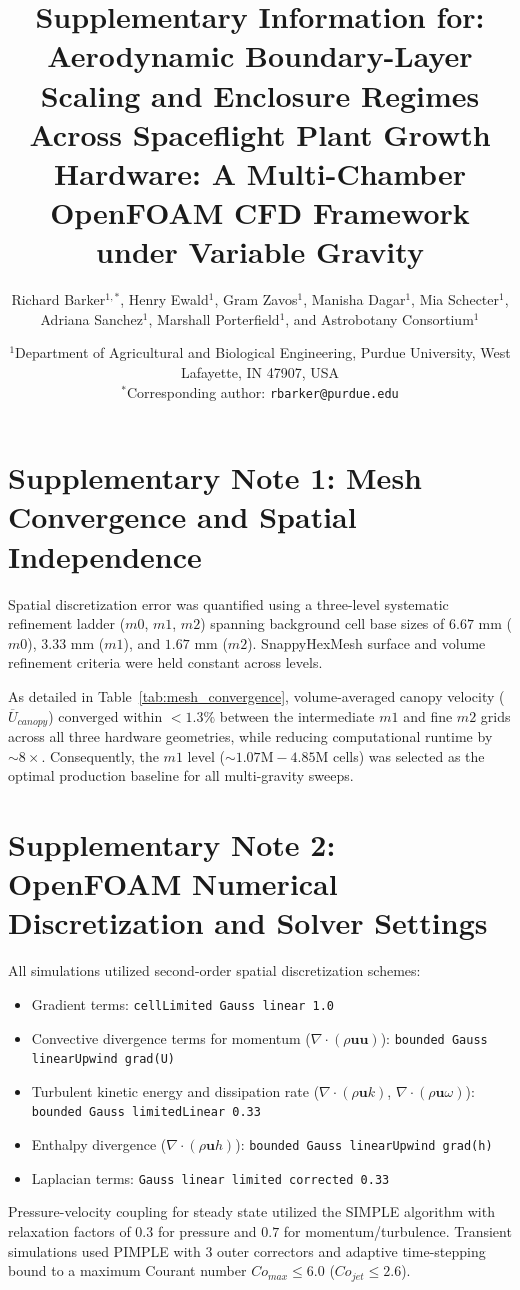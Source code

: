 \documentclass[12pt,a4paper]{article}
\title{\textbf{Supplementary Information for:\\
Aerodynamic Boundary-Layer Scaling and Enclosure Regimes Across Spaceflight Plant Growth Hardware: A Multi-Chamber OpenFOAM CFD Framework under Variable Gravity}}
\author{Richard Barker$^{1,*}$, Henry Ewald$^{1}$, Gram Zavos$^{1}$, Manisha Dagar$^{1}$, Mia Schecter$^{1}$, Adriana Sanchez$^{1}$, Marshall Porterfield$^{1}$, and Astrobotany Consortium$^{1}$}
\date{
\small
$^{1}$Department of Agricultural and Biological Engineering, Purdue University, West Lafayette, IN 47907, USA\\
$^*$Corresponding author: \texttt{rbarker@purdue.edu}
}
\begin{document}
\maketitle

\setcounter{table}{0}
\renewcommand{\thetable}{S\arabic{table}}
\setcounter{figure}{0}
\renewcommand{\thefigure}{S\arabic{figure}}

\section*{Supplementary Note 1: Mesh Convergence and Spatial Independence}

Spatial discretization error was quantified using a three-level systematic refinement ladder ($m0$, $m1$, $m2$) spanning background cell base sizes of $6.67\text{ mm}$ ($m0$), $3.33\text{ mm}$ ($m1$), and $1.67\text{ mm}$ ($m2$). SnappyHexMesh surface and volume refinement criteria were held constant across levels.

As detailed in Table~\ref{tab:mesh_convergence}, volume-averaged canopy velocity ($\overline{U}_{canopy}$) converged within $<1.3\%$ between the intermediate $m1$ and fine $m2$ grids across all three hardware geometries, while reducing computational runtime by $\sim8\times$. Consequently, the $m1$ level ($\sim1.07\text{M} - 4.85\text{M}$ cells) was selected as the optimal production baseline for all multi-gravity sweeps.



\section*{Supplementary Note 2: OpenFOAM Numerical Discretization and Solver Settings}

All simulations utilized second-order spatial discretization schemes:
\begin{itemize}
    \item Gradient terms: \texttt{cellLimited Gauss linear 1.0}
    \item Convective divergence terms for momentum ($\nabla \cdot (\rho \mathbf{u}\mathbf{u})$): \texttt{bounded Gauss linearUpwind grad(U)}
    \item Turbulent kinetic energy and dissipation rate ($\nabla \cdot (\rho \mathbf{u} k)$, $\nabla \cdot (\rho \mathbf{u} \omega)$): \texttt{bounded Gauss limitedLinear 0.33}
    \item Enthalpy divergence ($\nabla \cdot (\rho \mathbf{u} h)$): \texttt{bounded Gauss linearUpwind grad(h)}
    \item Laplacian terms: \texttt{Gauss linear limited corrected 0.33}
\end{itemize}

Pressure-velocity coupling for steady state utilized the SIMPLE algorithm with relaxation factors of $0.3$ for pressure and $0.7$ for momentum/turbulence. Transient simulations used PIMPLE with 3 outer correctors and adaptive time-stepping bound to a maximum Courant number $Co_{max} \le 6.0$ ($Co_{jet} \le 2.6$).



\end{document}
